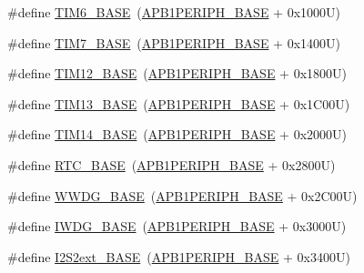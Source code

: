 \begin{DoxyCompactItemize}
\item 
\#define \hyperlink{group___peripheral__memory__map_ga8268ec947929f192559f28c6bf7d1eac}{T\+I\+M6\+\_\+\+B\+A\+SE}~(\hyperlink{group___peripheral__memory__map_ga45666d911f39addd4c8c0a0ac3388cfb}{A\+P\+B1\+P\+E\+R\+I\+P\+H\+\_\+\+B\+A\+SE} + 0x1000\+U)
\item 
\#define \hyperlink{group___peripheral__memory__map_ga0ebf54364c6a2be6eb19ded6b18b6387}{T\+I\+M7\+\_\+\+B\+A\+SE}~(\hyperlink{group___peripheral__memory__map_ga45666d911f39addd4c8c0a0ac3388cfb}{A\+P\+B1\+P\+E\+R\+I\+P\+H\+\_\+\+B\+A\+SE} + 0x1400\+U)
\item 
\#define \hyperlink{group___peripheral__memory__map_ga33dea32fadbaecea161c2ef7927992fd}{T\+I\+M12\+\_\+\+B\+A\+SE}~(\hyperlink{group___peripheral__memory__map_ga45666d911f39addd4c8c0a0ac3388cfb}{A\+P\+B1\+P\+E\+R\+I\+P\+H\+\_\+\+B\+A\+SE} + 0x1800\+U)
\item 
\#define \hyperlink{group___peripheral__memory__map_gad20f79948e9359125a40bbf6ed063590}{T\+I\+M13\+\_\+\+B\+A\+SE}~(\hyperlink{group___peripheral__memory__map_ga45666d911f39addd4c8c0a0ac3388cfb}{A\+P\+B1\+P\+E\+R\+I\+P\+H\+\_\+\+B\+A\+SE} + 0x1\+C00\+U)
\item 
\#define \hyperlink{group___peripheral__memory__map_ga862855347d6e1d92730dfe17ee8e90b8}{T\+I\+M14\+\_\+\+B\+A\+SE}~(\hyperlink{group___peripheral__memory__map_ga45666d911f39addd4c8c0a0ac3388cfb}{A\+P\+B1\+P\+E\+R\+I\+P\+H\+\_\+\+B\+A\+SE} + 0x2000\+U)
\item 
\#define \hyperlink{group___peripheral__memory__map_ga4265e665d56225412e57a61d87417022}{R\+T\+C\+\_\+\+B\+A\+SE}~(\hyperlink{group___peripheral__memory__map_ga45666d911f39addd4c8c0a0ac3388cfb}{A\+P\+B1\+P\+E\+R\+I\+P\+H\+\_\+\+B\+A\+SE} + 0x2800\+U)
\item 
\#define \hyperlink{group___peripheral__memory__map_ga9a5bf4728ab93dea5b569f5b972cbe62}{W\+W\+D\+G\+\_\+\+B\+A\+SE}~(\hyperlink{group___peripheral__memory__map_ga45666d911f39addd4c8c0a0ac3388cfb}{A\+P\+B1\+P\+E\+R\+I\+P\+H\+\_\+\+B\+A\+SE} + 0x2\+C00\+U)
\item 
\#define \hyperlink{group___peripheral__memory__map_ga8543ee4997296af5536b007cd4748f55}{I\+W\+D\+G\+\_\+\+B\+A\+SE}~(\hyperlink{group___peripheral__memory__map_ga45666d911f39addd4c8c0a0ac3388cfb}{A\+P\+B1\+P\+E\+R\+I\+P\+H\+\_\+\+B\+A\+SE} + 0x3000\+U)
\item 
\#define \hyperlink{group___peripheral__memory__map_gaa5f7b241ed5b756decd835300c9e7bc9}{I2\+S2ext\+\_\+\+B\+A\+SE}~(\hyperlink{group___peripheral__memory__map_ga45666d911f39addd4c8c0a0ac3388cfb}{A\+P\+B1\+P\+E\+R\+I\+P\+H\+\_\+\+B\+A\+SE} + 0x3400\+U)

\end{DoxyCompactItemize}
